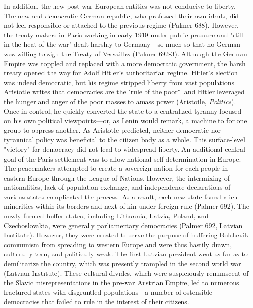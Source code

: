 \documentclass[letterpaper]{article}
\begin{document}
In addition, the new post-war European entities was not conducive to liberty. The new and democratic German republic, who professed their own ideals, did not feel responsible or attached to the previous regime (Palmer 688). However, the treaty makers in Paris working in early 1919 under public pressure and "still in the heat of the war" dealt harshly to Germany---so much so that no German was willing to sign the Treaty of Versailles (Palmer 692-3). Although the German Empire was toppled and replaced with a more democratic government, the harsh treaty opened the way for Adolf Hitler's authoritarian regime. Hitler's election was indeed democratic, but his regime stripped liberty from vast populations. Aristotle writes that democracies are the "rule of the poor", and Hitler leveraged the hunger and anger of the poor masses to amass power (Aristotle, \emph{Politics}). Once in control, he quickly converted the state to a centralized tyranny focused on his own political viewpoints---or, as Lenin would remark, a machine to for one group to oppress another. As Aristotle predicted, neither democratic nor tyrannical policy was beneficial to the citizen body as a whole. This surface-level "victory" for democracy did not lead to widespread liberty. An additional central goal of the Paris settlement was to allow national self-determination in Europe. The peacemakers attempted to create a sovereign nation for each people in eastern Europe through the League of Nations. However, the intermixing of nationalities, lack of population exchange, and independence declarations of various states complicated the process. As a result, each new state found alien minorities within its borders and next of kin under foreign rule (Palmer 692). The newly-formed buffer states, including Lithuania, Latvia, Poland, and Czechoslovakia, were generally parliamentary democracies (Palmer 692, Latvian Institute). However, they were created to serve the purpose of buffering Bolshevik communism from spreading to western Europe and were thus hastily drawn, culturally torn, and politically weak. The first Latvian president went as far as to demilitarize the country, which was presently trampled in the second world war (Latvian Institute). These cultural divides, which were suspiciously reminiscent of the Slavic misrepresentations in the pre-war Austrian Empire, led to numerous fractured states with disgruntled populations---a number of ostensible democracies that failed to rule in the interest of their citizens.
\end{document}
